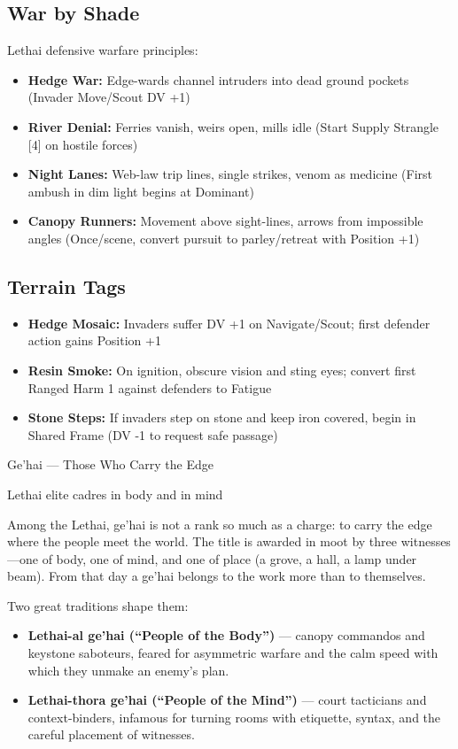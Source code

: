 \documentclass[11pt]{article}
\begin{document}
\subsection*{War by Shade}
Lethai defensive warfare principles:
\begin{itemize}
  \item \textbf{Hedge War:} Edge-wards channel intruders into dead ground pockets (Invader Move/Scout DV +1)
  \item \textbf{River Denial:} Ferries vanish, weirs open, mills idle (Start Supply Strangle [4] on hostile forces)
  \item \textbf{Night Lanes:} Web-law trip lines, single strikes, venom as medicine (First ambush in dim light begins at Dominant)
  \item \textbf{Canopy Runners:} Movement above sight-lines, arrows from impossible angles (Once/scene, convert pursuit to parley/retreat with Position +1)
\end{itemize}

\subsection*{Terrain Tags}
\begin{itemize}
  \item \textbf{Hedge Mosaic:} Invaders suffer DV +1 on Navigate/Scout; first defender action gains Position +1
  \item \textbf{Resin Smoke:} On ignition, obscure vision and sting eyes; convert first Ranged Harm 1 against defenders to Fatigue
  \item \textbf{Stone Steps:} If invaders step on stone and keep iron covered, begin in Shared Frame (DV -1 to request safe passage)
\end{itemize}
\clearpage

\begin{center}
  {\LARGE Ge'hai --- Those Who Carry the Edge}
  
  \bigskip
  {\large Lethai elite cadres in body and in mind}
  \end{center}
  
  Among the Lethai, ge'hai is not a rank so much as a charge: to carry the edge where the people meet the world. The title is awarded in moot by three witnesses---one of body, one of mind, and one of place (a grove, a hall, a lamp under beam). From that day a ge'hai belongs to the work more than to themselves.
  
  Two great traditions shape them:
  \begin{itemize}
  \item \textbf{Lethai-al ge'hai (``People of the Body'')} --- canopy commandos and keystone saboteurs, feared for asymmetric warfare and the calm speed with which they unmake an enemy's plan.
  \item \textbf{Lethai-thora ge'hai (``People of the Mind'')} --- court tacticians and context-binders, infamous for turning rooms with etiquette, syntax, and the careful placement of witnesses.
  \end{itemize}
  
\end{document}
